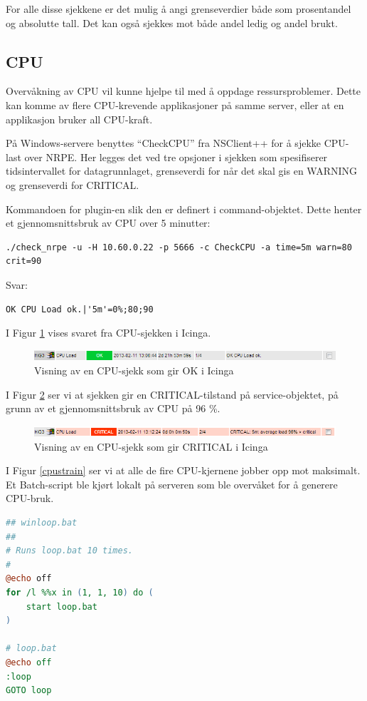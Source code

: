 For alle disse sjekkene er det mulig å angi grenseverdier både som prosentandel og absolutte tall. Det kan også sjekkes mot både andel ledig og andel brukt. 
\subsection{CPU}
Overvåkning av CPU vil kunne hjelpe til med å oppdage ressursproblemer. Dette kan komme av flere CPU-krevende applikasjoner på samme server, eller at en applikasjon bruker all CPU-kraft.  

På Windows-servere benyttes ``CheckCPU'' fra NSClient++ for å sjekke CPU-last over NRPE. Her legges det ved tre opsjoner i sjekken som spesifiserer tidsintervallet for datagrunnlaget, grenseverdi for når det skal gis en WARNING og grenseverdi for CRITICAL.

\clearpage
Kommandoen for plugin-en slik den er definert i command-objektet. Dette henter et gjennomsnittsbruk av CPU over 5 minutter: 
\begin{lstlisting}[style=example]
./check_nrpe -u -H 10.60.0.22 -p 5666 -c CheckCPU -a time=5m warn=80 crit=90
\end{lstlisting}
Svar:
\begin{lstlisting}[style=example]
OK CPU Load ok.|'5m'=0%;80;90
\end{lstlisting}

I Figur \ref{cpuok} vises svaret fra CPU-sjekken i Icinga. 
\begin{figure}[H]
    \centering
    \includegraphics[scale=0.8]{img/HiG3_cpu_ok}
    \caption{Visning av en CPU-sjekk som gir OK i Icinga}
    \label{cpuok}
\end{figure}

I Figur \ref{cpucritical} ser vi at sjekken gir en CRITICAL-tilstand på service-objektet, på grunn av et gjennomsnittsbruk av CPU på 96 \%. 
\begin{figure}[H]
    \centering
    \includegraphics[scale=0.8]{img/HiG3_cpu_critical}
    \caption{Visning av en CPU-sjekk som gir CRITICAL i Icinga}
    \label{cpucritical}
\end{figure}

I Figur \ref{cpustrain} ser vi at alle de fire CPU-kjernene jobber opp mot maksimalt. Et Batch-script ble kjørt lokalt på serveren som ble overvåket for å generere CPU-bruk.
\begin{lstlisting}[language=perl]
## winloop.bat
##
# Runs loop.bat 10 times.
#
@echo off
for /l %%x in (1, 1, 10) do (
    start loop.bat
)

# loop.bat
@echo off
:loop
GOTO loop
\end{lstlisting}

